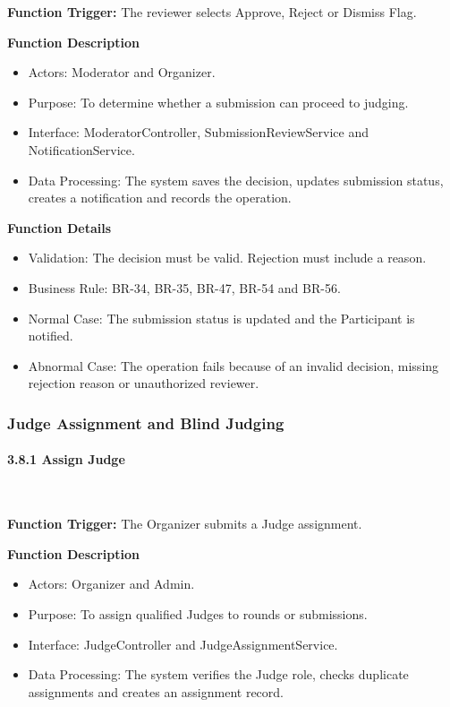 \textbf{Function Trigger:} The reviewer selects Approve, Reject or Dismiss Flag.

\textbf{Function Description}
\begin{itemize}[leftmargin=1.5em, nosep]
    \item Actors: Moderator and Organizer.
    \item Purpose: To determine whether a submission can proceed to judging.
    \item Interface: ModeratorController, SubmissionReviewService and NotificationService.
    \item Data Processing: The system saves the decision, updates submission status, creates a notification and records the operation.
\end{itemize}

\textbf{Function Details}
\begin{itemize}[leftmargin=1.5em, nosep]
    \item Validation: The decision must be valid. Rejection must include a reason.
    \item Business Rule: BR-34, BR-35, BR-47, BR-54 and BR-56.
    \item Normal Case: The submission status is updated and the Participant is notified.
    \item Abnormal Case: The operation fails because of an invalid decision, missing rejection reason or unauthorized reviewer.
\end{itemize}

\subsubsection{Judge Assignment and Blind Judging}
\label{subsubsec:judge-assignment-blind-judging}

\paragraph*{3.8.1 Assign Judge}\leavevmode\\[-0.5em]
\label{par:assign-judge}

\textbf{Function Trigger:} The Organizer submits a Judge assignment.

\textbf{Function Description}
\begin{itemize}[leftmargin=1.5em, nosep]
    \item Actors: Organizer and Admin.
    \item Purpose: To assign qualified Judges to rounds or submissions.
    \item Interface: JudgeController and JudgeAssignmentService.
    \item Data Processing: The system verifies the Judge role, checks duplicate assignments and creates an assignment record.
\end{itemize}

